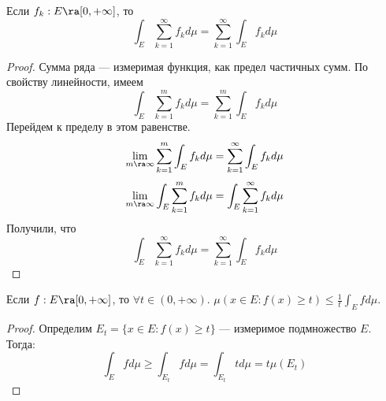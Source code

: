 \begin{corollary}
    Если \(f_k: E \ra [0, +\infty]\), то 
    \[\int_E \sum_{k = 1}^\infty f_k d \mu = \sum_{k = 1}^\infty \int_E f_k d \mu\]
\end{corollary}
\begin{proof}
    Сумма ряда --- измеримая функция, как предел частичных сумм. По свойству линейности, имеем
    \[\int_E \sum_{k = 1}^m f_k d \mu = \sum_{k = 1}^m \int_E f_k d \mu\]
    Перейдем к пределу в этом равенстве. 
    \[\lim_{m \ra \infty} \sum_{k = 1}^m \int_E f_k d \mu = \sum_{k = 1}^\infty \int_E f_k d \mu\]
    \[\lim_{m \ra \infty} \int_E \sum_{k = 1}^m f_k d \mu  = \int_E \sum_{k = 1}^\infty f_k d \mu\]
    Получили, что
    \[\int_E \sum_{k = 1}^\infty f_k d \mu = \sum_{k = 1}^\infty \int_E f_k d \mu\]
\end{proof}

\begin{theorem}
    Если \(f: E \ra [0, +\infty]\), то \(\forall t \in (0, +\infty)\). \(\mu(x \in E: f(x) \ge t) \le \frac{1}{t}\int_E f d \mu\).
\end{theorem}
\begin{proof}
    Определим \(E_t = \{x \in E: f(x) \ge t\}\) --- измеримое подмножество \(E\). Тогда:
    \[\int_E f d \mu \ge \int_{E_t}f d \mu = \int_{E_t} t d \mu = t \mu(E_t)\]
\end{proof}
